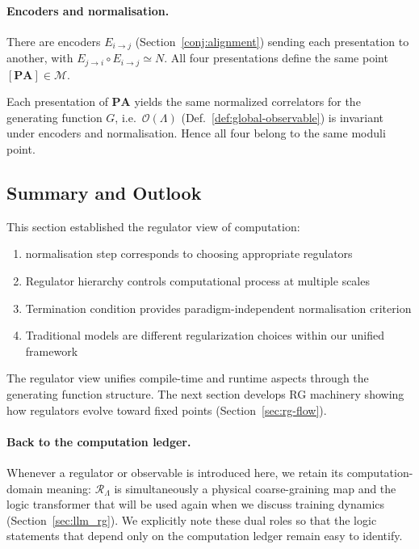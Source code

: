 \paragraph{Encoders and normalisation.}
There are encoders $E_{i\to j}$ (Section~\ref{conj:alignment}) sending each presentation to another,
with $E_{j\to i}\circ E_{i\to j}\simeq N$.
All four presentations define the same point $[\mathbf{PA}]\in\mathcal{M}$.

\begin{proposition}
Each presentation of $\mathbf{PA}$ yields the same normalized correlators for
the generating function $G$, i.e.\ $\mathcal{O}(\Lambda)$ (Def.~\ref{def:global-observable})
is invariant under encoders and normalisation. Hence all four belong to the same moduli point.
\end{proposition}

\subsection{Summary and Outlook}

This section established the regulator view of computation:

\begin{enumerate}
\item normalisation step corresponds to choosing appropriate regulators
\item Regulator hierarchy controls computational process at multiple scales
\item Termination condition provides paradigm-independent normalisation criterion
\item Traditional models are different regularization choices within our unified framework
\end{enumerate}

The regulator view unifies compile-time and runtime aspects through the generating function structure. The next section develops RG machinery showing how regulators evolve toward fixed points (Section~\ref{sec:rg-flow}).

\paragraph{Back to the computation ledger.} Whenever a regulator or observable is introduced here, we retain its computation-domain meaning: $\mathcal{R}_\Lambda$ is simultaneously a physical coarse-graining map and the logic transformer that will be used again when we discuss training dynamics (Section~\ref{sec:llm_rg}). We explicitly note these dual roles so that the logic statements that depend only on the computation ledger remain easy to identify.
